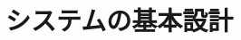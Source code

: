 \documentclass[lualatex,book,paper=a4paper,jafontsize=11.5pt,jafontscale=1.05,openany]{jlreq}
\begin{document}










\chapter{システムの基本設計}



\end{document}
